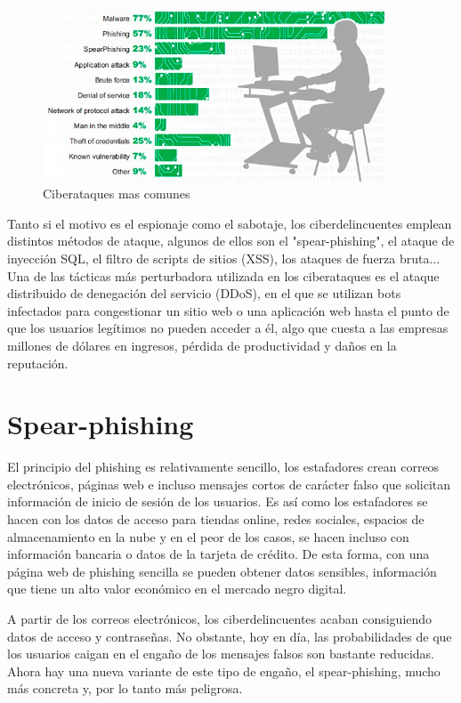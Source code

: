 \begin{figure}[tphb]
  		   \centering
     		   \includegraphics[width=4in]{ciberataques.png}
  		   \caption{Ciberataques mas comunes \cite{ciberataques}}
  		   \label{img:ciberataques}
\end{figure}

Tanto si el motivo es el espionaje como el sabotaje, los ciberdelincuentes emplean distintos métodos de ataque, algunos de ellos son el "spear-phishing",
 el ataque de inyección SQL, el filtro de scripts de sitios (XSS), los ataques de fuerza bruta... Una de las tácticas más perturbadora utilizada en los ciberataques 
es el ataque distribuido de denegación del servicio (DDoS), en el que se utilizan bots infectados para congestionar un sitio web o una aplicación web hasta el punto 
de que los usuarios legítimos no pueden acceder a él, algo que cuesta a las empresas millones de dólares en ingresos, pérdida de productividad y daños en la reputación.\nocite{akamai}

\section{Spear-phishing}
\label{sec:spear-phishing}

El principio del phishing es relativamente sencillo, los estafadores crean correos electrónicos, páginas web e incluso mensajes cortos de carácter falso 
que solicitan información de inicio de sesión de los usuarios. Es así como los estafadores se hacen con los datos de acceso para tiendas online, redes 
sociales, espacios de almacenamiento en la nube y en el peor de los casos, se hacen incluso con información bancaria o datos de la tarjeta de crédito. 
De esta forma, con una página web de phishing sencilla se pueden obtener datos sensibles, información que tiene un alto valor económico en el mercado 
negro digital.

A partir de los correos electrónicos,  los ciberdelincuentes acaban consiguiendo datos de acceso y contraseñas. No obstante, hoy en día, las 
probabilidades de que los usuarios caigan en el engaño de los mensajes falsos son bastante reducidas. Ahora hay una nueva variante de este tipo de 
engaño, el spear-phishing, mucho más concreta y, por lo tanto más peligrosa.

